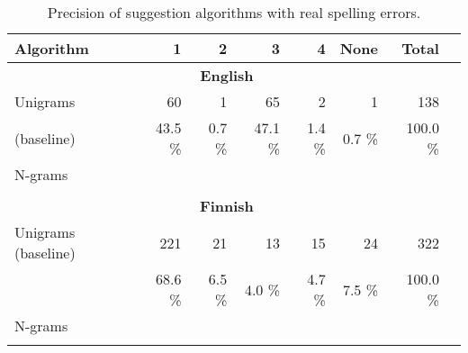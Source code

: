\documentclass{llncs}
\begin{document}
\begin{table*}[h]
    \caption{Precision of suggestion algorithms with real spelling errors.
    \label{table:real-eval}}
  \begin{center}
    \begin{scriptsize}
      \begin{tabular}{lrrrrrrr}
        \hline
        Algorithm & 1 & 2 & 3 & 4 & None & Total \\
        \hline
        \multicolumn{7}{c}{\textbf{English}} \\
        \hline
        Unigrams 
& 60 & 1 & 65 & 2 & 1 & 138 \\
        (baseline) 
& 43.5 \% & 0.7 \% & 47.1 \% & 1.4 \% & 0.7 \%  & 100.0 \% \\
        \hline
        N-grams 
& & & & & & & \\
& & & & & & & \\
        \hline
        \multicolumn{7}{c}{\textbf{Finnish}} \\
        \hline
        Unigrams  
        (baseline) 
& 221    & 21    & 13    & 15    & 24    & 322 \\
& 68.6 \% & 6.5 \% & 4.0 \% & 4.7 \% & 7.5 \% & 100.0 \% \\

        \hline
        N-grams
&       &      &      &      &       &       &     \\
&       &      &      &      &       &       &     \\
        \hline
      \end{tabular}
    \end{scriptsize}
  \end{center}
\end{table*}
\end{document}
